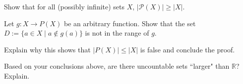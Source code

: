 \documentclass[12pt]{exam}
\begin{document}
\begin{qparts}
    \item Show that for all (possibly infinite) sets $X$, $|\mathcal{P}(X)| \ge |X|.$
    \item Let $g\colon X \to P(X)$ be an arbitrary function.
    Show that the set $D := \{a\in X \mid a\notin g(a)\}$ is not in the range of $g$.
    \item Explain why this shows that $|P(X)| \leq |X|$ is false and conclude the proof.    
    \item Based on your conclusions above, are there uncountable sets ``larger" than $\mathbb{R}$? Explain.
\end{qparts}

\begin{solution}

\end{solution}
\end{document}
